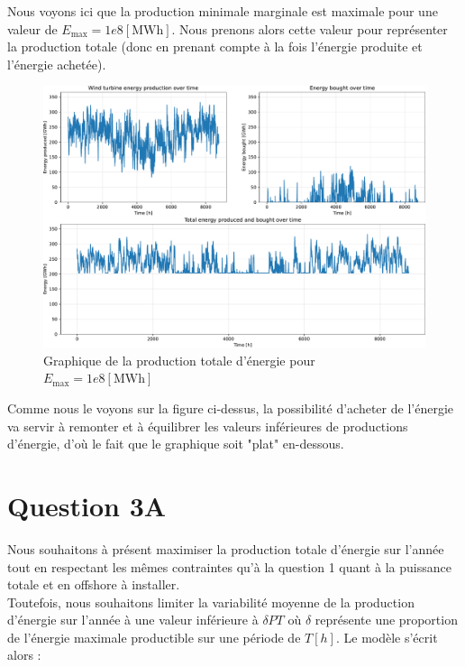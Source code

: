 \documentclass{article}
\begin{document}
\pagebreak

Nous voyons ici que la production minimale marginale est maximale pour une valeur de $E_{\text{max}} = 1e8 [\mathrm{MWh}]$.
Nous prenons alors cette valeur pour représenter la production totale (donc en prenant compte à la fois l'énergie produite et l'énergie achetée). 

\begin{figure}[ht!]
    \centering
    \includegraphics[scale=0.3]{Images/Partie_1/Q2/energy_produced_and_bought.pdf}
    \caption{Graphique de la production totale d'énergie pour $E_{\text{max}} = 1e8 [\mathrm{MWh}]$}
    \label{fig:total_energy_produced_and_bought_Q2}
\end{figure}
Comme nous le voyons sur la figure ci-dessus, la possibilité d'acheter de l'énergie va servir à remonter et à équilibrer les valeurs inférieures de productions d'énergie, d'où le fait que le graphique soit "plat" en-dessous.

\newpage
\section*{Question 3A}

Nous souhaitons à présent maximiser la production totale d'énergie sur l'année tout en respectant les mêmes contraintes qu'à la question 1 quant à la puissance totale et en offshore à installer.\\
Toutefois, nous souhaitons limiter la variabilité moyenne de la production d'énergie sur l'année à une valeur inférieure à $\delta P T$ où $\delta$ représente une proportion de l'énergie maximale productible sur une période de $T [h]$. Le modèle s'écrit alors :
\end{document}
